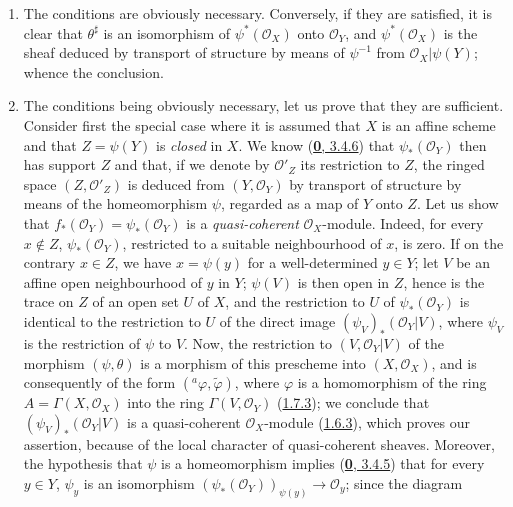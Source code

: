 \begin{enumerate}
  \item[\emph{a)}] The conditions are obviously necessary. Conversely, if they
  are satisfied, it is clear that $\theta^\sharp$ is an isomorphism of
  $\psi^*(\mathscr{O}_X)$ onto $\mathscr{O}_Y$, and
  $\psi^*(\mathscr{O}_X)$ is the sheaf deduced by transport of structure by
  means of $\psi^{-1}$ from $\mathscr{O}_X|\psi(Y)$; whence the
  conclusion.
  \item[\emph{b)}] The conditions being obviously necessary, let us prove that they
  are sufficient. Consider first the special case where it is assumed that
  $X$ is an affine scheme and that $Z=\psi(Y)$ is \emph{closed} in $X$. We
  know (\hyperref[0.3.4.6]{\textbf{0}, 3.4.6}) that $\psi_*(\mathscr{O}_Y)$ then has
  support $Z$ and that, if we denote by $\mathscr{O}'_Z$ its restriction
  to $Z$, the ringed space $(Z,\mathscr{O}'_Z)$ is deduced from
  $(Y,\mathscr{O}_Y)$ by transport of structure by means of the
  homeomorphism $\psi$, regarded as a map of $Y$ onto $Z$.
  Let us show that $f_*(\mathscr{O}_Y)=\psi_*(\mathscr{O}_Y)$ is a
  \emph{quasi-coherent} $\mathscr{O}_X$-module. Indeed, for every
  $x\notin Z$, $\psi_*(\mathscr{O}_Y)$, restricted to a suitable neighbourhood
  of $x$, is zero. If on the contrary $x\in Z$, we have $x=\psi(y)$ for a
  well-determined $y\in Y$; let $V$ be an affine open neighbourhood of $y$ in
  $Y$; $\psi(V)$ is then open in $Z$, hence is the trace on $Z$ of an open set
  $U$ of $X$, and the restriction to $U$ of $\psi_*(\mathscr{O}_Y)$ is identical
  to the restriction to $U$ of the direct
  image $(\psi_V)_*(\mathscr{O}_Y|V)$, where $\psi_V$ is the restriction of
  $\psi$ to $V$. Now, the restriction to $(V,\mathscr{O}_Y|V)$ of the morphism
  $(\psi,\theta)$ is a morphism of this prescheme into
  $(X,\mathscr{O}_X)$, and is consequently of the form
  $({}^a\varphi,\widetilde{\varphi})$, where $\varphi$ is a homomorphism of
  the ring $A=\Gamma(X,\mathscr{O}_X)$ into the ring
  $\Gamma(V,\mathscr{O}_Y)$ (\hyperref[I.1.7.3]{1.7.3}); we conclude
  that $(\psi_V)_*(\mathscr{O}_Y|V)$ is a quasi-coherent $\mathscr{O}_X$-module
  (\hyperref[I.1.6.3]{1.6.3}), which proves our
  assertion, because of the local character of quasi-coherent sheaves.
  Moreover, the hypothesis that $\psi$ is a homeomorphism implies
  (\hyperref[0.3.4.5]{\textbf{0}, 3.4.5}) that for every $y\in Y$, $\psi_y$ is an
  isomorphism
  $(\psi_*(\mathscr{O}_Y))_{\psi(y)}\to\mathscr{O}_y$; since the diagram
  \label{I.4.2.2.theta-diagram}

\end{enumerate}
